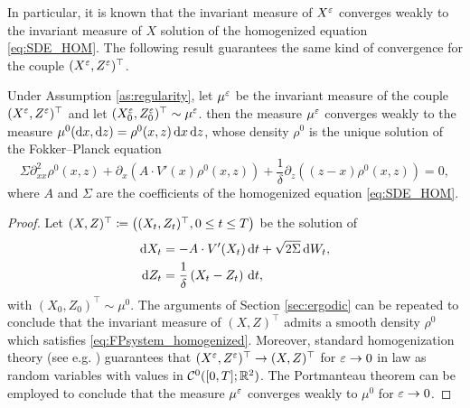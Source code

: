 \documentclass[10pt]{article}
\begin{document}
 In particular, it is known that the invariant measure of $X^\varepsilon$ converges weakly to the invariant measure of $X$ solution of the homogenized equation \eqref{eq:SDE_HOM}. The following result guarantees the same kind of convergence for the couple $(X^\varepsilon, Z^\varepsilon)^\top$.

\begin{lemma}\label{lem:convMeasure} Under Assumption \ref{as:regularity}, let $\mu^\varepsilon$ be the invariant measure of the couple $(X^\varepsilon, Z^\varepsilon)^\top$ and let $(X_0^\varepsilon, Z_0^\varepsilon)^\top \sim \mu^\varepsilon$.  then the measure $\mu^\varepsilon$ converges weakly to the measure $\mu^0(\mathrm{d} x, \mathrm{d} z) = \rho^0(x, z) \,\mathrm{d} x \,\mathrm{d} z$, whose density $\rho^0$ is the unique solution of the Fokker--Planck equation
\begin{equation} \label{eq:FPsystem_homogenized}
	\Sigma \partial^2_{xx} \rho^0(x,z) + \partial_x\left( A \cdot V'(x) \rho^0(x,z) \right) + \frac{1}{\delta}\partial_z\left((z - x) \rho^0(x,z) \right) = 0,
\end{equation}
where $A$ and $\Sigma$ are the coefficients of the homogenized equation \eqref{eq:SDE_HOM}.
\end{lemma}

\begin{proof} Let $(X, Z)^\top \coloneqq \left((X_t, Z_t)^\top, 0\leq t \leq T\right)$ be the solution of
	\begin{equation}
	\label{eq:systemSDEHom}
	\begin{aligned}
	\mathrm{d} X_t &= -A \cdot V'(X_t) \,\mathrm{d} t + \sqrt{2\Sigma} \,\mathrm{d} W_t, \\
	\mathrm{d} Z_t &= \frac{1}{\delta} \left ( X_t - Z_t \right ) \,\mathrm{d} t,
	\end{aligned}
	\end{equation} 
	with $(X_0, Z_0)^\top \sim \mu^0$. The arguments of Section \ref{sec:ergodic} can be repeated to conclude that the invariant measure of $(X, Z)^\top$ admits a smooth density $\rho^0$ which satisfies \eqref{eq:FPsystem_homogenized}. Moreover, standard homogenization theory (see e.g. \cite[Chapter 3]{BLP78}) guarantees that $(X^\varepsilon,Z^\varepsilon)^\top \to (X,Z)^\top$ for $\varepsilon \to 0$ in law as random variables with values in $\mathcal C^0([0, T]; \mathbb{R}^2)$. The Portmanteau theorem can be employed to conclude that the measure $\mu^\varepsilon$ converges weakly to $\mu^0$ for $\varepsilon \to 0$.
\end{proof}
\end{document}
